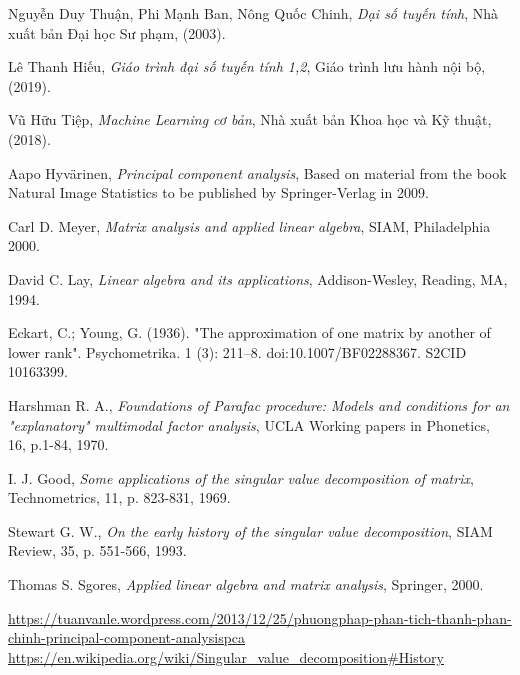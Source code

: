 \documentclass[14pt,oneside,a4paper]{report}
\numberwithin{equation}{section}
\begin{document}
\clearpage
\begin{thebibliography}{99}
Nguyễn Duy Thuận, Phi Mạnh Ban, Nông Quốc Chinh,
\emph{Dại số tuyến tính},
Nhà xuất bản Đại học Sư phạm, (2003).

Lê Thanh Hiếu,
\emph{Giáo trình đại số tuyến tính 1,2},
Giáo trình lưu hành nội bộ, (2019).

Vũ Hữu Tiệp,
\emph{Machine Learning cơ bản},
Nhà xuất bản Khoa học và Kỹ thuật, (2018).

Aapo Hyvärinen,
\emph{Principal component analysis},
Based on material from the book Natural Image Statistics to be published by Springer-Verlag in 2009.

Carl D. Meyer,
\emph{Matrix analysis and applied linear algebra},
SIAM, Philadelphia 2000.


David C. Lay,
\emph{Linear algebra and its applications},
Addison-Wesley, Reading, MA, 1994.

Eckart, C.; Young, G. (1936). "The approximation of one matrix by another of lower rank". Psychometrika. 1 (3): 211–8. doi:10.1007/BF02288367. S2CID 10163399.

Harshman R. A.,
\emph{Foundations of Parafac procedure: Models and conditions for an "explanatory" multimodal factor analysis},
UCLA Working papers in Phonetics, 16, p.1-84, 1970.

I. J. Good,
\emph{Some applications of the singular value decomposition of matrix},
Technometrics, 11, p. 823-831, 1969.


Stewart G. W.,
\emph{On the early history of the singular value decomposition},
SIAM Review, 35, p. 551-566, 1993.

Thomas S. Sgores,
\emph{Applied linear algebra and matrix analysis},
Springer, 2000.
	
\url{https://tuanvanle.wordpress.com/2013/12/25/phuongphap-phan-tich-thanh-phan-chinh-principal-component-analysispca}
\url{https://en.wikipedia.org/wiki/Singular_value_decomposition#History}
\end{thebibliography}
\end{document}
